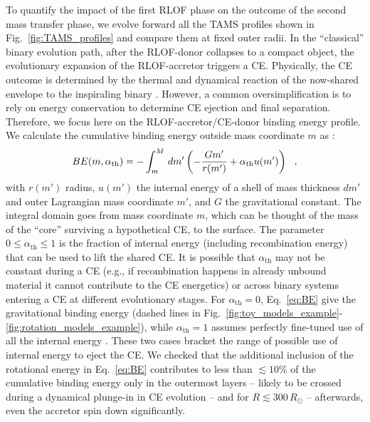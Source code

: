 \documentclass[twocolumn,twocolappendix,trackchanges]{aastex63}
\DeclareRobustCommand{\Eqref}[1]{Eq.~\ref{#1}}
\DeclareRobustCommand{\Figref}[1]{Fig.~\ref{#1}}
\begin{document}
To quantify the impact of the first RLOF phase on the outcome of the
second mass transfer phase, we evolve forward all the TAMS profiles
shown in \Figref{fig:TAMS_profiles} and compare them at fixed outer
radii. In the ``classical'' binary evolution path, after the
RLOF-donor collapses to a compact object, the evolutionary expansion
of the RLOF-accretor triggers a CE. Physically, the CE outcome is
determined by the thermal and dynamical reaction of the now-shared
envelope to the inspiraling binary \citep[e.g.,][]{ivanova:2013,
  ivanova:2020, renzo:21gwce}. However, a common oversimplification is
to rely on energy conservation
\citep[``$\alpha_{\mathrm{CE}}\lambda_\mathrm{CE}$ algorithm'',
e.g.,][]{webbink:1984, dekool:1990, demarco:11} to determine CE
ejection and final separation. Therefore, we focus here on the
RLOF-accretor/CE-donor binding energy profile. We calculate the
cumulative binding energy outside mass coordinate $m$ as
\citep[e.g.,][]{dekool:1990, han:95, dewi:2000, lau:2022}:
\begin{equation}
  \label{eq:BE}
BE(m, \alpha_{\rm th}) = - \int_{m}^M\,dm'\left( -\frac{G m'}{r(m')}+\alpha_\mathrm{th} u(m')\right) \ \ ,
\end{equation}
with $r(m')$ radius, $u(m')$ the internal energy of a shell of mass
thickness $dm'$ and outer Lagrangian mass coordinate $m'$, and $G$ the
gravitational constant. The integral domain goes from mass coordinate
$m$, which can be thought of the mass of the ``core'' surviving a
hypothetical CE, to the surface. The parameter
$0\leq \alpha_\mathrm{th}\leq 1$ is the fraction of internal energy
(including recombination energy) that can be used to lift the shared
CE. It is possible that $\alpha_\mathrm{th}$ may not be constant
during a CE (e.g., if recombination happens in already unbound
material it cannot contribute to the CE energetics) or across binary
systems entering a CE at different evolutionary stages. For
$\alpha_\mathrm{th}=0$, \Eqref{eq:BE} give the gravitational binding
energy (dashed lines in
\Figref{fig:toy_models_example}-\ref{fig:rotation_models_example}),
while $\alpha_{\mathrm{th}}=1$ assumes perfectly fine-tuned use of all
the internal energy \citep[solid lines,][]{klencki:2020}. These two
cases bracket the range of possible use of internal energy to eject
the CE. We checked that the additional inclusion of the rotational
energy in \Eqref{eq:BE} %
contributes to less than $\lesssim 10\%$ of the cumulative binding
energy only in the outermost layers -- likely to be crossed during a
dynamical plunge-in in CE evolution -- and for $R\lesssim 300\,R_\odot$
-- afterwards, even the accretor spin down significantly.
\end{document}
